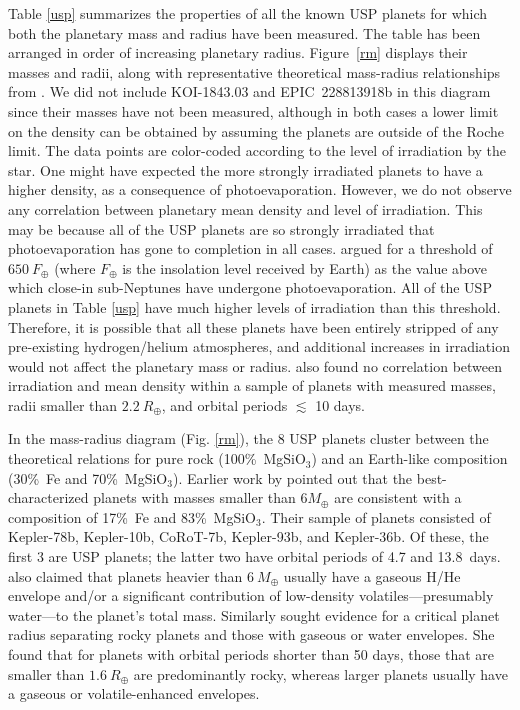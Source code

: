 \documentclass[twocolumn]{aastex61}
\begin{document}
Table \ref{usp} summarizes the properties of all the known USP planets for which both
the planetary mass and radius have been measured. The table has been arranged in order of increasing planetary radius.
Figure~\ref{rm} displays their masses and radii, along with representative theoretical
mass-radius relationships from \citet{Zeng2016}. We did not include KOI-1843.03 \citep{Rappaport2013} and EPIC~228813918b \citep{Smith2017} in this diagram since their masses have not been measured, although
in both cases a lower limit on the density can be
obtained by assuming the planets are outside of
the Roche limit. The data points
are color-coded according to the level of irradiation by the star. One might have expected the more strongly irradiated planets to have a higher density,
as a consequence of photoevaporation.
However, we do not observe any correlation between planetary mean density and level of irradiation.
This may be because all of the USP planets are so strongly irradiated that photoevaporation has gone
to completion in all cases.
\citet{Lundkvist2016} argued for a threshold of $650~F_{\oplus}$  (where $F_{\oplus}$ is the insolation level received by Earth) as the value above
which close-in sub-Neptunes have undergone photoevaporation.
All of the USP planets in Table \ref{usp} have much higher levels of irradiation than this threshold.
Therefore, it is possible that all these planets have been entirely stripped of any pre-existing hydrogen/helium atmospheres,
and additional increases in irradiation would not affect the planetary mass or radius.
\citet{Ballard2014} also found no correlation between irradiation and mean density within a sample
of planets with measured masses, radii smaller than $2.2~R_{\oplus}$, and orbital periods $\lesssim$ 10 days.

In the mass-radius diagram (Fig. \ref{rm}), the 8 USP planets cluster between the theoretical relations
for pure rock (100\%~MgSiO$_3$) and an Earth-like composition (30\%~Fe and 70\%~MgSiO$_3$).
Earlier work by \citet{Dressing2015} pointed out that the best-characterized planets with masses smaller
than 6$M_{\oplus}$ are consistent with a composition of 17\%~Fe and 83\%~MgSiO$_3$.
Their sample of planets consisted of Kepler-78b, Kepler-10b, CoRoT-7b, Kepler-93b, and Kepler-36b.
Of these, the first 3 are USP planets; the latter two have orbital periods of 4.7 and 13.8~days.
\citet{Dressing2015} also claimed that planets heavier than $6~M_{\oplus}$ usually have a gaseous H/He envelope and/or a significant contribution of low-density
volatiles---presumably water---to the planet's total mass. Similarly \citet{Rogers2015} sought evidence for a critical planet radius separating
rocky planets and those with gaseous or water envelopes. She found that for planets with orbital periods shorter than 50 days, those that are smaller than $1.6~R_{\oplus}$ are predominantly rocky, whereas larger planets usually have a gaseous or volatile-enhanced envelopes.
\end{document}
